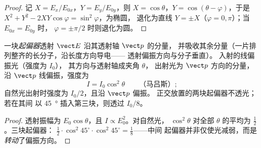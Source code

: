 \begin{proof}
记 $X = E_x/E_{0x}$，$Y = E_y/E_{0y}$，则 $X = \cos\theta$，$Y = \cos(\theta - \varphi)$，于是
$X^2 + Y^2 - 2XY\cos\varphi = \sin^2\varphi$，为椭圆，
退化为直线 $Y = \pm X$（$\varphi = 0, \pi$）；当 $E_{0x} = E_{0y}$ 时，
$\varphi = \pm\pi/2$ 时则退化为圆。
\end{proof}

\begin{proposition}[起偏器与马吕斯定律]\label{prop:b2:plane-waves-polarization:malus}
一块\emph{起偏器}透射 $\vect E$ 沿其透射轴 $\vect p$ 的分量，
并吸收其余分量（一片排列整齐的长分子，沿长度方向导电——
透射偏振方向与分子垂直）。
入射的线偏振光（强度为 $I_0$），
其方向与透射轴成夹角 $\theta$，
出射光为 $\vect p$ 方向的分量，沿 $\vect p$ 线偏振，强度为
\[
I = I_0\cos^2\theta \qquad\text{（马吕斯）} ;
\]
自然光出射时强度为 $I_0/2$，且沿 $\vect p$ 偏振。
正交放置的两块起偏器不透光；若在其间
以 \qty{45}{\degree} 插入第三块，则透过 $I_0/8$。
\end{proposition}

\begin{proof}
透射振幅为 $E_0\cos\theta$，且 $I \propto E_0^2$。对自然光，
$\cos^2\theta$ 对全部 $\theta$ 的平均为 $\tfrac12$。三块起偏器：
$\tfrac12\cdot\cos^2 45^\circ\cdot\cos^2 45^\circ = \tfrac18$——中间
起偏器并非仅使光减弱，而是\emph{转动}了偏振方向。
\end{proof}

